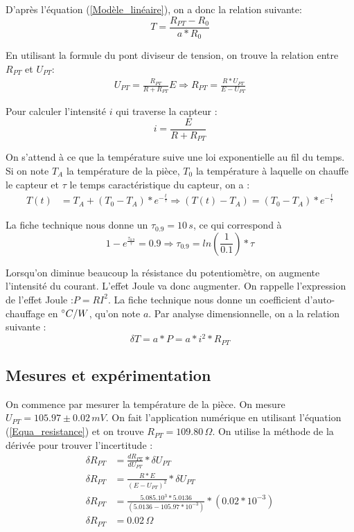 \documentclass[12pt]{article}
\begin{document}
D'après l'équation (\ref{Modèle_linéaire}), on a donc la relation suivante:
\begin{equation}
T=\frac{R_{PT}-R_0}{a*R_0}
\label{Equation_température}
\end{equation}

En utilisant la formule du pont diviseur de tension, on trouve la relation entre $R_{PT}$ et $U_{PT}$:
\begin{align}
U_{PT}=\frac{R_{PT}}{R+R_{PT}}E \Rightarrow R_{PT}=\frac{R*U_{PT}}{E-U_{PT}}
\label{Equa_resistance}
\end{align}

Pour calculer l'intensité $i$ qui traverse la capteur : 
\begin{equation}
i=\frac{E}{R+R_{PT}}
\label{Equa_intensité}
\end{equation}

On s'attend à ce que la température suive une loi exponentielle au fil du temps. Si on note $T_A$ la température de la pièce, $T_0$ la température à laquelle on chauffe le capteur et $\tau$ le temps caractéristique du capteur, on a :
\begin{align}
T(t)&=T_A+(T_0-T_A)*e^{-\frac{t}{\tau}}\Rightarrow
(T(t)-T_A)=(T_0-T_A)*e^{-\frac{t}{\tau}}
\label{exponentielle}
\end{align}   

La fiche technique nous donne un $\tau_{0.9}=10\, s$, ce qui correspond à 
\begin{equation}
1-e^{\frac{\tau_{0.9}}{\tau}}=0.9 \Rightarrow \tau_{0.9}=ln(\frac{1}{0.1})*\tau
\label{Equa_tempsréponse}
\end{equation}

Lorsqu'on diminue beaucoup la résistance du potentiomètre, on augmente l'intensité du courant. L'effet Joule va donc augmenter. On rappelle l'expression de l'effet Joule :$P=RI^2$. La fiche technique nous donne un coefficient d'auto-chauffage en $\degree C/W$, qu'on note $a$. Par analyse dimensionnelle, on a la relation suivante :
\begin{equation}
\delta T=a*P=a*i^2*R_{PT}
\label{Equation_puissance}
\end{equation}



\subsection{Mesures et expérimentation}

On commence par mesurer la température de la pièce. On mesure $U_{PT}=105.97\pm 0.02\, mV$. On fait l'application numérique en utilisant l'équation (\ref{Equa_resistance}) et on trouve $R_{PT}=109.80\, \Omega$. On utilise la méthode de la dérivée pour trouver l'incertitude :
\begin{align*}
\delta R_{PT}&=\frac{dR_{PT}}{dU_{PT}}*\delta U_{PT} \\
\delta R_{PT}&=\frac{R*E}{(E-U_{PT})^2}*\delta U_{PT} \\
\delta R_{PT}&=\frac{5.085.10^{3}*5.0136}{(5.0136-105.97*10^{-3})}*(0.02*10^{-3})\\
\delta R_{PT}&=0.02\, \Omega
\end{align*}
\end{document}
